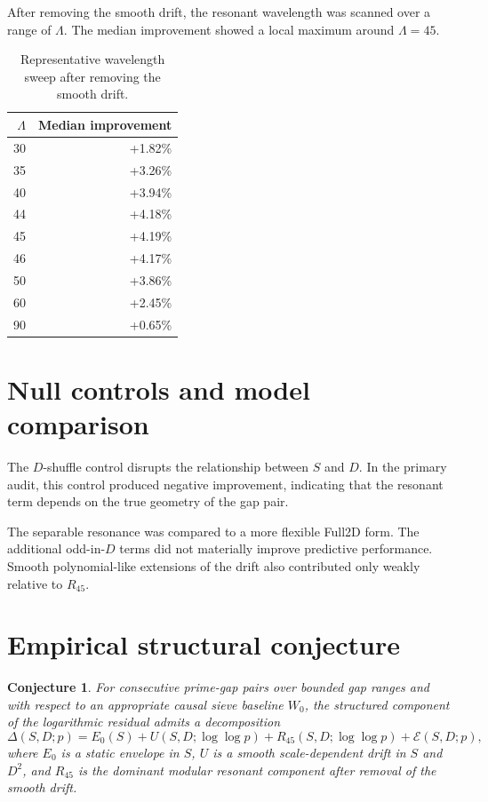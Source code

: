\documentclass[11pt]{article}
\newtheorem{conjecture}{Conjecture}
\begin{document}
After removing the smooth drift, the resonant wavelength was scanned over a range of \(\Lambda\). The median improvement showed a local maximum around \(\Lambda=45\).

\begin{table}[h]
\centering
\begin{tabular}{rr}
\toprule
\(\Lambda\) & Median improvement\\
\midrule
30 & +1.82\%\\
35 & +3.26\%\\
40 & +3.94\%\\
44 & +4.18\%\\
45 & +4.19\%\\
46 & +4.17\%\\
50 & +3.86\%\\
60 & +2.45\%\\
90 & +0.65\%\\
\bottomrule
\end{tabular}
\caption{Representative wavelength sweep after removing the smooth drift.}
\end{table}

\section{Null controls and model comparison}

The \(D\)-shuffle control disrupts the relationship between \(S\) and \(D\). In the primary audit, this control produced negative improvement, indicating that the resonant term depends on the true geometry of the gap pair.

The separable resonance was compared to a more flexible Full2D form. The additional odd-in-\(D\) terms did not materially improve predictive performance. Smooth polynomial-like extensions of the drift also contributed only weakly relative to \(R_{45}\).

\section{Empirical structural conjecture}

\begin{conjecture}
For consecutive prime-gap pairs over bounded gap ranges and with respect to an appropriate causal sieve baseline \(W_0\), the structured component of the logarithmic residual admits a decomposition
\[
\Delta(S,D;p)
=
E_0(S)
+
U(S,D;\log\log p)
+
R_{45}(S,D;\log\log p)
+
\mathcal{E}(S,D;p),
\]
where \(E_0\) is a static envelope in \(S\), \(U\) is a smooth scale-dependent drift in \(S\) and \(D^2\), and \(R_{45}\) is the dominant modular resonant component after removal of the smooth drift.
\end{conjecture}
\end{document}
